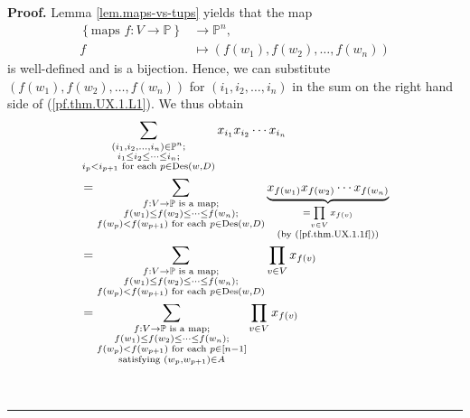 \documentclass[numbers=enddot,12pt,final,onecolumn,notitlepage]{scrartcl}%
\numberwithin{exer}{section}
\theoremstyle{definition}
\newenvironment{proof}[1][Proof]{\noindent\textbf{#1.} }{\ \rule{0.5em}{0.5em}}
\let\sumnonlimits\sum
\let\prodnonlimits\prod
\renewcommand{\sum}{\sumnonlimits\limits}
\renewcommand{\prod}{\prodnonlimits\limits}
\begin{document}
\begin{proof}
Lemma \ref{lem.maps-vs-tups} yields that the map
\begin{align*}
\left\{  \text{maps }f:V\rightarrow\mathbb{P}\right\}   &  \rightarrow
\mathbb{P}^{n},\\
f  &  \mapsto\left(  f\left(  w_{1}\right)  ,f\left(  w_{2}\right)
,\ldots,f\left(  w_{n}\right)  \right)
\end{align*}
is well-defined and is a bijection. Hence, we can substitute $\left(  f\left(
w_{1}\right)  ,f\left(  w_{2}\right)  ,\ldots,f\left(  w_{n}\right)  \right)
$ for $\left(  i_{1},i_{2},\ldots,i_{n}\right)  $ in the sum on the right hand
side of (\ref{pf.thm.UX.1.L1}). We thus obtain
\begin{align*}
&  \sum_{\substack{\left(  i_{1},i_{2},\ldots,i_{n}\right)  \in\mathbb{P}%
^{n};\\i_{1}\leq i_{2}\leq\cdots\leq i_{n};\\i_{p}<i_{p+1}\text{ for each
}p\in\operatorname*{Des}\left(  w,D\right)  }}x_{i_{1}}x_{i_{2}}\cdots
x_{i_{n}}\\
&  =\sum_{\substack{f:V\rightarrow\mathbb{P}\text{ is a map};\\f\left(
w_{1}\right)  \leq f\left(  w_{2}\right)  \leq\cdots\leq f\left(
w_{n}\right)  ;\\f\left(  w_{p}\right)  <f\left(  w_{p+1}\right)  \text{ for
each }p\in\operatorname*{Des}\left(  w,D\right)  }}\underbrace{x_{f\left(
w_{1}\right)  }x_{f\left(  w_{2}\right)  }\cdots x_{f\left(  w_{n}\right)  }%
}_{\substack{=\prod_{v\in V}x_{f\left(  v\right)  }\\\text{(by
(\ref{pf.thm.UX.1.1f}))}}}\\
&  =\sum_{\substack{f:V\rightarrow\mathbb{P}\text{ is a map};\\f\left(
w_{1}\right)  \leq f\left(  w_{2}\right)  \leq\cdots\leq f\left(
w_{n}\right)  ;\\f\left(  w_{p}\right)  <f\left(  w_{p+1}\right)  \text{ for
each }p\in\operatorname*{Des}\left(  w,D\right)  }}\prod_{v\in V}x_{f\left(
v\right)  }\\
&  =\sum_{\substack{f:V\rightarrow\mathbb{P}\text{ is a map};\\f\left(
w_{1}\right)  \leq f\left(  w_{2}\right)  \leq\cdots\leq f\left(
w_{n}\right)  ;\\f\left(  w_{p}\right)  <f\left(  w_{p+1}\right)  \text{ for
each }p\in\left[  n-1\right]  \\\text{satisfying }\left(  w_{p},w_{p+1}%
\right)  \in A}}\prod_{v\in V}x_{f\left(  v\right)  }%
\end{align*}

\end{proof}
\end{document}
